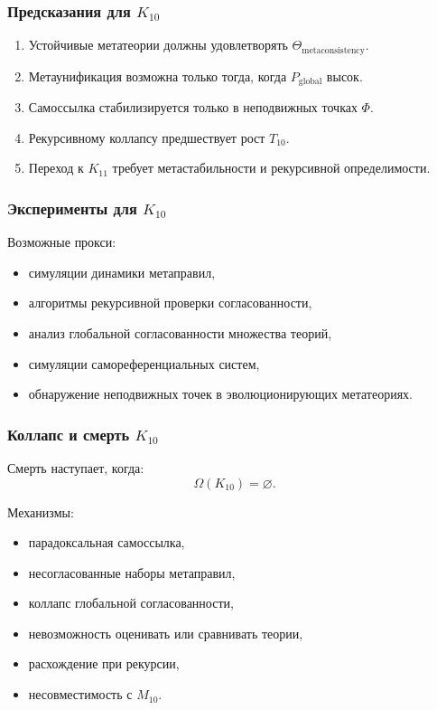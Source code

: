 \subsubsection{Предсказания для $K_{10}$}

\begin{enumerate}
    \item Устойчивые метатеории должны удовлетворять $\Theta_{\mathrm{metaconsistency}}$.
    \item Метаунификация возможна только тогда, когда $P_{\mathrm{global}}$ высок.
    \item Самоссылка стабилизируется только в неподвижных точках $\Phi$.
    \item Рекурсивному коллапсу предшествует рост $T_{10}$.
    \item Переход к $K_{11}$ требует метастабильности и рекурсивной определимости.
\end{enumerate}

\subsubsection{Эксперименты для $K_{10}$}

Возможные прокси:
\begin{itemize}
    \item симуляции динамики метаправил,
    \item алгоритмы рекурсивной проверки согласованности,
    \item анализ глобальной согласованности множества теорий,
    \item симуляции самореференциальных систем,
    \item обнаружение неподвижных точек в эволюционирующих метатеориях.
\end{itemize}

\subsubsection{Коллапс и смерть $K_{10}$}

Смерть наступает, когда:
\[
\Omega(K_{10})=\varnothing.
\]

Механизмы:
\begin{itemize}
    \item парадоксальная самоссылка,
    \item несогласованные наборы метаправил,
    \item коллапс глобальной согласованности,
    \item невозможность оценивать или сравнивать теории,
    \item расхождение при рекурсии,
    \item несовместимость с $M_{10}$.
\end{itemize}

